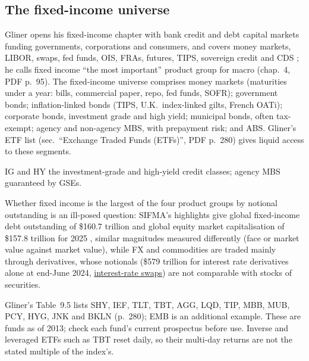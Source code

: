 \subsection{The fixed-income universe}

\begin{qfdefinition}\label{def:fixed-income-universe}
 Gliner opens his fixed-income chapter with bank credit and debt capital markets funding governments, corporations and consumers, and covers money markets, LIBOR, swaps, fed funds, OIS, FRAs, futures, TIPS, sovereign credit and CDS \citep[chap.~9, opening, PDF p.~245]{s7-gliner}; he calls fixed income ``the most important'' product group for macro (chap.~4, PDF p.~95). The fixed-income universe comprises money markets (maturities under a year: bills, commercial paper, repo, fed funds, SOFR); government bonds; inflation-linked bonds (TIPS, U.K.\ index-linked gilts, French OATi); corporate bonds, investment grade and high yield; municipal bonds, often tax-exempt; agency and non-agency MBS, with prepayment risk; and ABS. Gliner's ETF list (sec.\ ``Exchange Traded Funds (ETFs)'', PDF p.~280) gives liquid access to these segments.

 IG and HY the investment-grade and high-yield credit classes; agency MBS guaranteed by GSEs.

 Whether fixed income is the largest of the four product groups by notional outstanding is an ill-posed question: SIFMA's highlights give global fixed-income debt outstanding of \$160.7 trillion and global equity market capitalisation of \$157.8 trillion for 2025 \citep[Fact Book highlights, sec.~1, published 13 August 2026]{sifma-factbook-2026}, similar magnitudes measured differently (face or market value against market value), while FX and commodities are traded mainly through derivatives, whose notionals (\$579 trillion for interest rate derivatives alone at end-June 2024, \hyperref[def:interest-rate-swaps]{interest-rate swaps}) are not comparable with stocks of securities.

 Gliner's Table~9.5 lists SHY, IEF, TLT, TBT, AGG, LQD, TIP, MBB, MUB, PCY, HYG, JNK and BKLN (p.~280); EMB is an additional example. These are funds as of 2013; check each fund's current prospectus before use. Inverse and leveraged ETFs such as TBT reset daily, so their multi-day returns are not the stated multiple of the index's.


\end{qfdefinition}

